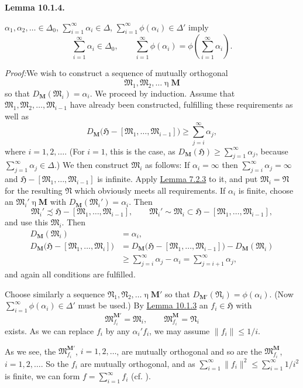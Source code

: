 \documentclass[12pt,b5paper,twoside]{article}
\newcommand{\Hspace}{\mathfrak H}
\newcommand{\M}{\mathbf M}
\newcommand{\Lemma}[1]{%
  \par\smallskip\noindent\phantomsection\label{lem:#1}\textbf{Lemma #1.}\enspace
}
\newcommand{\Proof}{\par\noindent\textit{Proof:}\enspace}
\newcommand{\lemref}[1]{\hyperref[lem:#1]{Lemma #1}}
\begin{document}
\Lemma{10.1.4}
$\alpha_1,\alpha_2,\ldots\in\Delta_0$,
$\sum_{i=1}^{\infty}\alpha_i\in\Delta$,
$\sum_{i=1}^{\infty}\phi(\alpha_i)\in\Delta'$ imply
\[
 \sum_{i=1}^{\infty}\alpha_i\in\Delta_0,
 \qquad
 \sum_{i=1}^{\infty}\phi(\alpha_i)
 =\phi\left(\sum_{i=1}^{\infty}\alpha_i\right).
\]

\Proof We wish to construct a sequence of mutually orthogonal
\[
 \mathfrak M_1,\mathfrak M_2,\ldots\mathbin\eta\M
\]
so that $D_{\M}(\mathfrak M_i)=\alpha_i$. We proceed by induction. Assume
that $\mathfrak M_1,\mathfrak M_2,\ldots,\mathfrak M_{i-1}$ have already
been constructed, fulfilling these requirements as well as
\[
 D_{\M}\bigl(\Hspace-[\mathfrak M_1,\ldots,\mathfrak M_{i-1}]\bigr)
 \geq\sum_{j=i}^{\infty}\alpha_j,
\]
where $i=1,2,\ldots$. (For $i=1$, this is the case, as
$D_{\M}(\Hspace)\geq\sum_{j=1}^{\infty}\alpha_j$, because
$\sum_{j=1}^{\infty}\alpha_j\in\Delta$.) We then construct
$\mathfrak M_i$ as follows: If $\alpha_i=\infty$ then
$\sum_{j=i}^{\infty}\alpha_j=\infty$ and
$\Hspace-[\mathfrak M_1,\ldots,\mathfrak M_{i-1}]$ is infinite. Apply
\lemref{7.2.3} to it, and put $\mathfrak M_i=\mathfrak N$ for the resulting
$\mathfrak N$ which obviously meets all requirements. If $\alpha_i$ is
finite, choose an $\mathfrak M_i'\mathbin\eta\M$ with
$D_{\M}(\mathfrak M_i')=\alpha_i$. Then
\[
 \mathfrak M_i'\precsim
 \Hspace-[\mathfrak M_1,\ldots,\mathfrak M_{i-1}],
 \qquad
 \mathfrak M_i'\sim\mathfrak M_i\subset
 \Hspace-[\mathfrak M_1,\ldots,\mathfrak M_{i-1}],
\]
and use this $\mathfrak M_i$. Then
\begin{align*}
 D_{\M}(\mathfrak M_i)&=\alpha_i,\\
 D_{\M}\bigl(\Hspace-[\mathfrak M_1,\ldots,\mathfrak M_i]\bigr)
 &=D_{\M}\bigl(\Hspace-[\mathfrak M_1,\ldots,\mathfrak M_{i-1}]\bigr)
   -D_{\M}(\mathfrak M_i)\\
 &\geq\sum_{j=i}^{\infty}\alpha_j-\alpha_i
   =\sum_{j=i+1}^{\infty}\alpha_j,
\end{align*}
and again all conditions are fulfilled.

Choose similarly a sequence
$\mathfrak N_1,\mathfrak N_2,\ldots\mathbin\eta\M'$ so that
$D_{\M'}(\mathfrak N_i)=\phi(\alpha_i)$. (Now
$\sum_{i=1}^{\infty}\phi(\alpha_i)\in\Delta'$ must be used.) By
\lemref{10.1.3} an $f_i\in\Hspace$ with
\[
 \mathfrak M_{f_i}^{\M'}=\mathfrak M_i,
 \qquad \mathfrak M_{f_i}^{\M}=\mathfrak N_i
\]
exists. As we can replace $f_i$ by any $\alpha_i'f_i$, we may assume
$\lVert f_i\rVert\leq1/i$.

As we see, the $\mathfrak M_{f_i}^{\M'}$, $i=1,2,\ldots$, are mutually
orthogonal and so are the $\mathfrak M_{f_i}^{\M}$,
$i=1,2,\ldots$. So the $f_i$ are mutually orthogonal, and as
$\sum_{i=1}^{\infty}\lVert f_i\rVert^2\leq
\sum_{i=1}^{\infty}1/i^2$ is finite, we can form
$f=\sum_{i=1}^{\infty}f_i$ (cf. \cite[p.~67]{ref16}).
\end{document}

